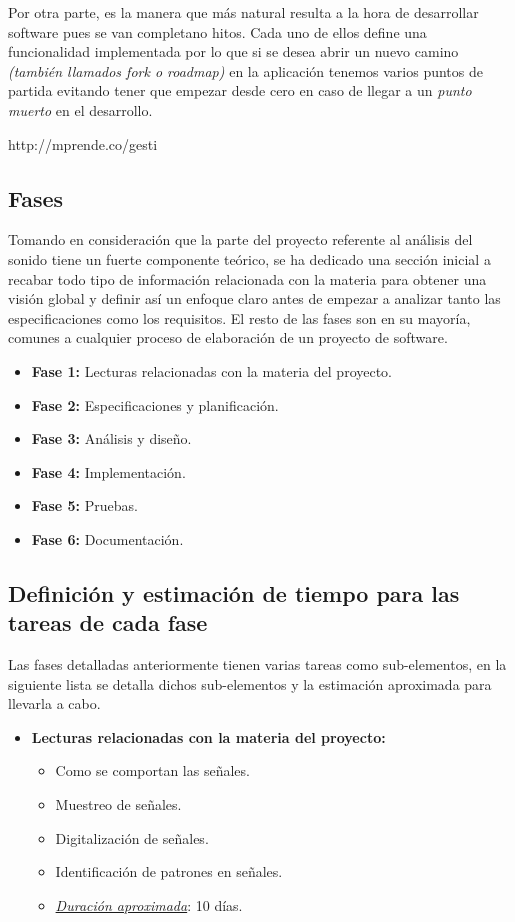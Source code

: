 Por otra parte, es la manera que más natural resulta a la hora de desarrollar software pues se van completano hitos. Cada uno de ellos define una funcionalidad implementada por lo que si se desea abrir un nuevo camino \textit{(también llamados fork o roadmap)} en la aplicación tenemos varios puntos de partida evitando tener que empezar desde cero en caso de llegar a un \textit{punto muerto} en el desarrollo.

http://mprende.co/gesti%

\subsection{Fases}
Tomando en consideración que la parte del proyecto referente al análisis del sonido tiene un fuerte componente teórico, se ha dedicado una sección inicial a recabar todo tipo de información relacionada con la materia para obtener una visión global y definir así un enfoque claro antes de empezar a analizar tanto las especificaciones como los requisitos. El resto de las fases son en su mayoría, comunes a cualquier proceso de elaboración de un proyecto de software.

\begin{itemize}
  \item \textbf{Fase 1:} Lecturas relacionadas con la materia del proyecto.
  \item \textbf{Fase 2:} Especificaciones y planificación.
  \item \textbf{Fase 3:} Análisis y diseño.
  \item \textbf{Fase 4:} Implementación.
  \item \textbf{Fase 5:} Pruebas.
  \item \textbf{Fase 6:} Documentación.
\end{itemize}

\newpage
\subsection{Definición y estimación de tiempo para las tareas de cada fase}

Las fases detalladas anteriormente tienen varias tareas como sub-elementos, en la siguiente lista se detalla dichos sub-elementos y la estimación aproximada para llevarla a cabo.

\begin{itemize}
   \item \textbf{Lecturas relacionadas con la materia del proyecto:}
   \begin{itemize}
    \item Como se comportan las señales.
    \item Muestreo de señales.
    \item Digitalización de señales.
    \item Identificación de patrones en señales.
    \item \underline{\textit{Duración aproximada}}: 10 días.
    \end{itemize}
\end{itemize}

